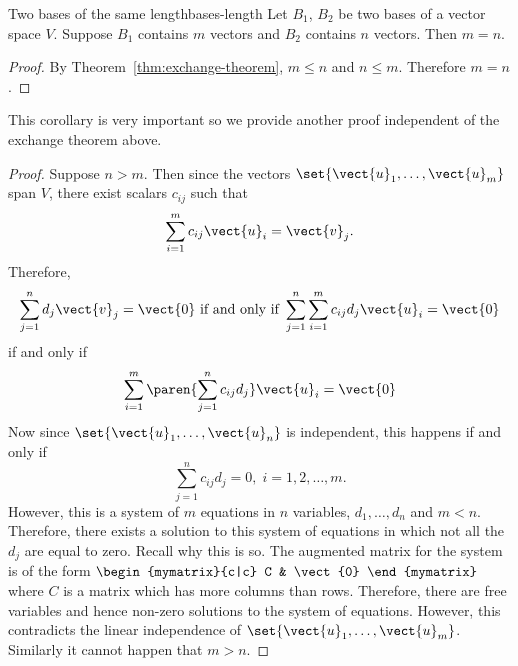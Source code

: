 \begin{corollary}{Two bases of the same length}{bases-length}
  Let $B_1$, $B_2$ be two bases of a vector space $V$. Suppose $B_1$
  contains $m$ vectors and $B_2$ contains $n$ vectors. Then
  $m = n$.
\end{corollary}

\begin{proof}
  By Theorem~\ref{thm:exchange-theorem}, $m\leq n$ and $n\leq
  m$. Therefore $m=n$.
\end{proof}

This corollary is very important so we provide another proof
independent of the exchange theorem above.

\begin{proof}
  Suppose $n > m$. Then since the vectors
  $\set{\vect{u} _{1},\ldots,\vect{u}_{m}} $ span $V$, there exist
  scalars $c_{ij}$ such that
  \begin{equation*}
    \sum_{i=1}^{m}c_{ij}\vect{u}_{i}=\vect{v}_{j}.
  \end{equation*}
  Therefore,
  \begin{equation*}
    \sum_{j=1}^{n}d_{j}\vect{v}_{j}=\vect{0}
    \text{ if and only if }\sum_{j=1}^{n}\sum_{i=1}^{m}c_{ij}d_{j}\vect{u}_{i}=
    \vect{0}
  \end{equation*}
  if and only if
  \begin{equation*}
    \sum_{i=1}^{m}\paren{\sum_{j=1}^{n}c_{ij}d_{j}} \vect{u}_{i}=\vect{
      0}
  \end{equation*}
  Now since $\set{\vect{u}_{1},\ldots,\vect{u}_{n}}$ is independent, this
  happens if and only if
  \begin{equation*}
    \sum_{j=1}^{n}c_{ij}d_{j}=0,\;i=1,2,\ldots,m.
  \end{equation*}
  However, this is a system of $m$ equations in $n$ variables,
  $d_{1},\ldots,d_{n}$ and $m<n$. Therefore, there exists a solution
  to this system of equations in which not all the $d_{j}$ are equal
  to zero. Recall why this is so. The augmented matrix for the system
  is of the form $\begin{mymatrix}{c|c} C & \vect{0}
  \end{mymatrix} $ where $C$ is a matrix which has more columns than
  rows. Therefore, there are free variables and hence non-zero
  solutions to the system of equations. However, this contradicts the
  linear independence of $\set{
    \vect{u}_{1},\ldots,\vect{u}_{m}}$. Similarly it cannot happen
  that $m > n$.
\end{proof}

